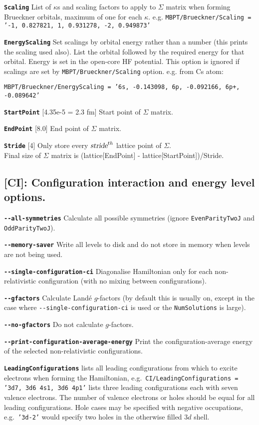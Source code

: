 \documentclass[a4paper,11pt]{article}
\newcommand{\option}[1]{\smallskip\noindent\textbf{\texttt{#1}}}
\newcommand{\code}[1]{\texttt{#1}}
\begin{document}
\option{Scaling} List of $\kappa$s and scaling factors to apply to $\Sigma$ matrix when forming Brueckner orbitals, maximum of one for each $\kappa$.
e.g. \code{MBPT/Brueckner/Scaling = '-1, 0.827821, 1, 0.931278, -2, 0.949873'}

\option{EnergyScaling} Set scalings by orbital energy rather than a number (this prints the scaling used also). List the orbital followed by the required energy for that orbital. Energy is set in the open-core HF potential.
This option is ignored if scalings are set by \code{MBPT/Brueckner/Scaling} option.
e.g. from Cs atom:  {\code{MBPT/Brueckner/EnergyScaling = '6s, -0.143098, 6p, -0.092166, 6p+, -0.089642'}

\option{StartPoint} [4.35e-5 = 2.3 fm] Start point of $\Sigma$ matrix.

\option{EndPoint} [8.0] End point of $\Sigma$ matrix.

\option{Stride} [4] Only store every $\textsl{stride}^{th}$ lattice point of $\Sigma$.\\
Final size of $\Sigma$ matrix is (lattice[EndPoint] - lattice[StartPoint])/Stride.

\subsection{[CI]: Configuration interaction and energy level options.}

\option{-{}-all-symmetries} Calculate all possible symmetries (ignore \code{EvenParityTwoJ} and \code{OddParityTwoJ}).

\option{-{}-memory-saver} Write all levels to disk and do not store in memory when levels are not being used.

\option{-{}-single-configuration-ci} Diagonalise Hamiltonian only for each non-relativistic configuration (with no mixing between configurations).

\option{-{}-gfactors} Calculate Land\'e $g$-factors (by default this is usually on, except in the case where  \code{-{}-single-configuration-ci} is used or the \code{NumSolutions} is large).

\option{-{}-no-gfactors} Do not calculate $g$-factors.

\option{-{}-print-configuration-average-energy} Print the configuration-average energy of the selected non-relativistic configurations.

\option{LeadingConfigurations} lists all leading configurations from which to excite electrons when forming the Hamiltonian, e.g.~\texttt{CI/LeadingConfigurations = '3d7, 3d6 4s1, 3d6 4p1'} lists three leading configurations each with seven valence electrons. The number of valence electrons or holes should be equal for all leading configurations. Hole cases may be specified with negative occupations, e.g.~\code{'3d-2'} would specify two holes in the otherwise filled $3d$ shell.

}
\end{document}
